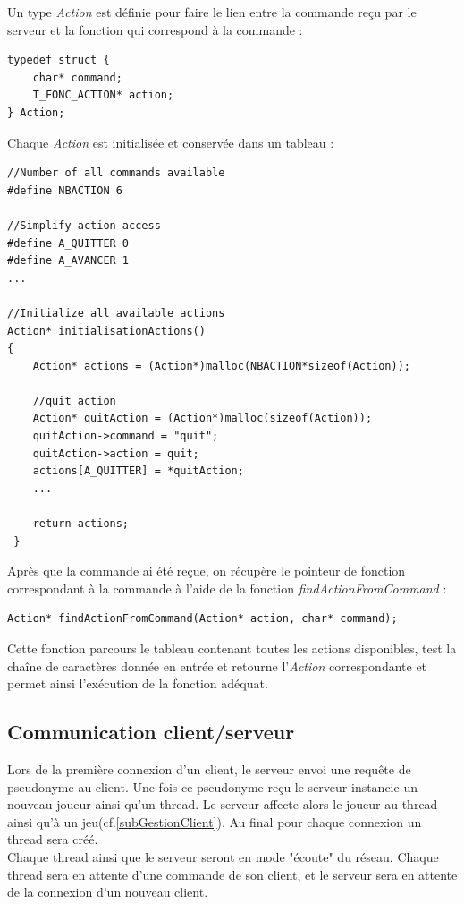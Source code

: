 \documentclass[a4paper,10pt]{article}
\begin{document}
	Un type \emph{Action} est définie pour faire le lien entre la commande reçu par le serveur et la fonction qui correspond à la commande :
\begin{lstlisting}
typedef struct {
    char* command;
    T_FONC_ACTION* action;
} Action;
\end{lstlisting}

	Chaque \emph{Action} est initialisée et conservée dans un tableau :

\begin{lstlisting}
//Number of all commands available
#define NBACTION 6

//Simplify action access
#define A_QUITTER 0
#define A_AVANCER 1
...

//Initialize all available actions
Action* initialisationActions()
{
    Action* actions = (Action*)malloc(NBACTION*sizeof(Action));

    //quit action
    Action* quitAction = (Action*)malloc(sizeof(Action));
    quitAction->command = "quit";
    quitAction->action = quit;
    actions[A_QUITTER] = *quitAction;
    ...
    
	return actions;
 }
\end{lstlisting}

	Après que la commande ai été reçue, on récupère le pointeur de fonction correspondant à la commande à l'aide de la fonction \emph{findActionFromCommand} :
\begin{lstlisting}
Action* findActionFromCommand(Action* action, char* command);
\end{lstlisting}

	Cette fonction parcours le tableau contenant toutes les actions disponibles, test la chaîne de caractères donnée en entrée et retourne l'\emph{Action}
correspondante et permet ainsi l'exécution de la fonction adéquat.

	\subsection{Communication client/serveur}
	Lors de la première connexion d'un client, le serveur envoi une requête de pseudonyme au client. Une fois ce pseudonyme reçu le serveur instancie un
nouveau joueur ainsi qu'un thread. Le serveur affecte alors le joueur au thread ainsi qu'à un jeu(cf.\ref{subGestionClient}). Au final pour chaque connexion un
thread sera créé.\\
	Chaque thread ainsi que le serveur seront en mode "écoute" du réseau. Chaque thread sera en attente d'une commande de son client, et le serveur sera en
attente de la connexion d'un nouveau client.\\
\end{document}
